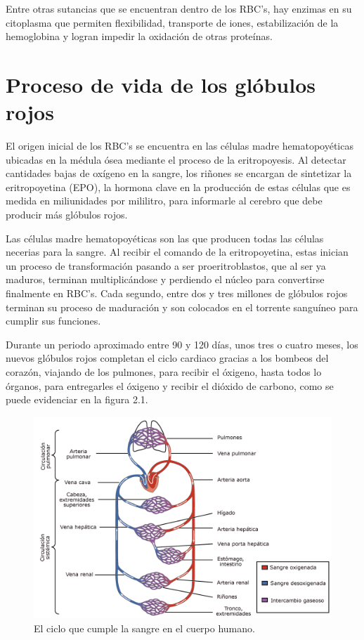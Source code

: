 Entre otras sutancias que se encuentran dentro de los RBC's, hay enzimas en su citoplasma que permiten flexibilidad, transporte de iones, estabilización de la hemoglobina y logran impedir la oxidación de otras proteínas.

\section{Proceso de vida de los glóbulos rojos}\label{sec:RBC:vida}

El origen inicial de los RBC's se encuentra en las células madre hematopoyéticas ubicadas en la médula ósea mediante el proceso de la eritropoyesis. Al detectar cantidades bajas de oxígeno en la sangre, los riñones se encargan de sintetizar la eritropoyetina (EPO), la hormona clave en la producción de estas células que es medida en miliunidades por mililitro, para informarle al cerebro que debe producir más glóbulos rojos. 

Las células madre hematopoyéticas son las que producen todas las células necerias para la sangre. Al recibir el comando de la eritropoyetina, estas inician un proceso de transformación pasando a ser proeritroblastos, que al ser ya maduros, terminan multiplicándose y perdiendo el núcleo para convertirse finalmente en RBC's. Cada segundo, entre dos y tres millones de glóbulos rojos terminan su proceso de maduración y son colocados en el torrente sanguíneo para cumplir sus funciones.

Durante un periodo aproximado entre 90 y 120 días, unos tres o cuatro meses, los nuevos glóbulos rojos completan el ciclo cardiaco gracias a los bombeos del corazón, viajando de los pulmones, para recibir el óxigeno, hasta todos lo órganos, para entregarles el óxigeno y recibir el dióxido de carbono, como se puede evidenciar en la figura 2.1.

\begin{figure}[H]
    \centering
    \includegraphics[scale=0.2]{figures/CicloSangre.jpg}
    \caption{El ciclo que cumple la sangre en el cuerpo humano.}
    \label{sec:RBC:fig:CicloSangre}
\end{figure}

